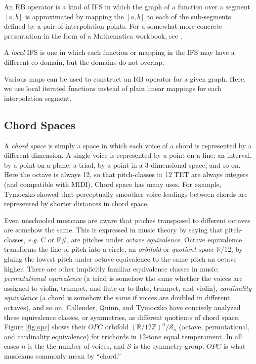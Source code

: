 \documentclass[english,11pt,letterpaper,onecolumn]{scrartcl}
\numberwithin{equation}{section}
\begin{document}
An RB operator is a kind of IFS in which the graph of a function over a segment
$[a, b]$ is approximated by mapping the $[a, b]$ to each of the sub-segments
defined by a pair of interpolation points. For a somewhat more concrete
presentation in the form of a Mathematica workbook, see \cite{McClure2006}.

A \textit{local} IFS is one in which each function or mapping in the IFS may
have a different co-domain, but the domains do not overlap.

Various maps can be used to construct an RB operator for a given graph. Here, we
use local iterated functions instead of plain linear mappings for each
interpolation segment.

\subsection{Chord Spaces}

A \textit{chord space} is simply a space in which each voice of a chord is
represented by a different dimension. A single voice is represented by a point
on a line; an interval, by a point on a plane; a triad, by a point in a
3-dimensional space; and so on. Here the octave is always 12, so that
pitch-classes in 12 TET are always integers (and compatible with MIDI). Chord
space has many uses. For example, Tymoczko \cite{tymoczko2006geometry,
tymoczko2011geometry} showed that perceptually smoother voice-leadings between
chords are represented by shorter distances in chord space.

Even unschooled musicians are aware that pitches transposed to different octaves
are somehow the same. This is expressed in music theory by saying that
pitch-classes, \textit{e.g.} C or F\#, are pitches under \textit{octave
equivalence}. Octave equivalence transforms the line of pitch into a circle, an
\textit{orbifold} or \textit{quotient space} $\mathbb{R}/12$, by gluing the
lowest pitch under octave equivalence to the same pitch an octave higher. There
are other implicitly familiar equivalence classes in music:
\textit{permutational equivalence} (a triad is somehow the same whether the
voices are assigned to violin, trumpet, and flute or to flute, trumpet, and
violin), \textit{cardinality equivalence} (a chord is somehow the same if voices
are doubled in different octaves), and so on. Callender, Quinn, and Tymoczko
\cite{callender:346} have concisely analyzed these equivalence classes, or
symmetries, as different quotients of chord space. Figure \ref{fig:opc} shows
their $OPC$ orbifold $\left(\mathbb{R}/12\mathbb{Z}\right)^{n}/\mathcal{S}_{n}$
(octave, permutational, and cardinality equivalence) for trichords in 12-tone
equal temperament. In all cases $n$ is the the number of voices, and
$\mathcal{S}$ is the symmetry group. $OPC$ is what musicians commonly mean by
``chord.''
\end{document}
